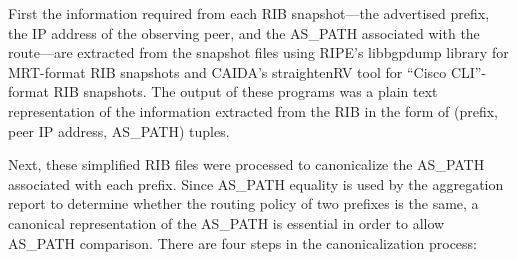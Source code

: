 First the information required from each RIB snapshot---the advertised prefix,
the IP address of the observing peer, and the AS\_PATH associated with the
route---are extracted from the snapshot files using RIPE's libbgpdump library
\cite{libbgpdump} for MRT-format RIB snapshots and CAIDA's straightenRV tool
\cite{straightenrv} for ``Cisco CLI''-format RIB snapshots. The output of these
programs was a plain text representation of the information extracted from the
RIB in the form of (prefix, peer IP address, AS\_PATH) tuples.

Next, these simplified RIB files were processed to canonicalize the AS\_PATH
associated with each prefix. Since AS\_PATH equality is used by the aggregation
report to determine whether the routing policy of two prefixes is the same, a
canonical representation of the AS\_PATH is essential in order to allow
AS\_PATH comparison. There are four steps in the canonicalization process:

